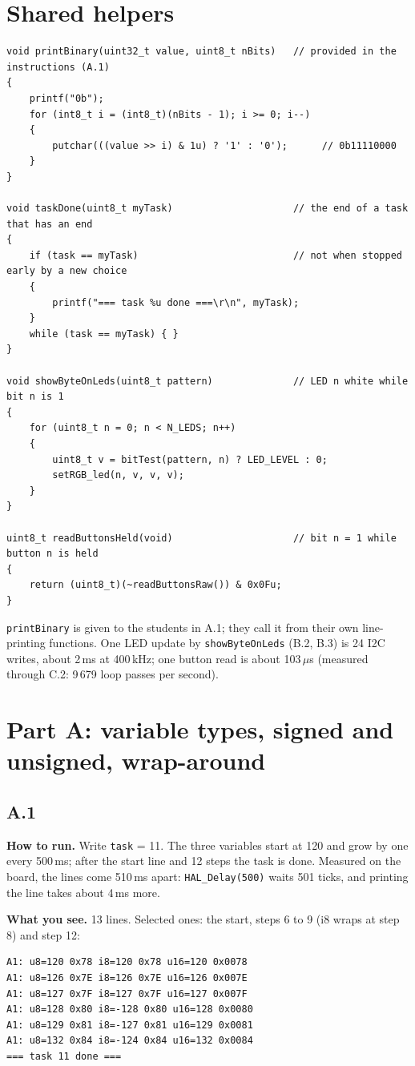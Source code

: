 \documentclass[11pt,a4paper]{article}
\newcommand{\lv}[1]{\texttt{#1}}                 %
\newcommand{\run}[1]{\textbf{How to run.} #1}
\newcommand{\see}[1]{\textbf{What you see.} #1}
\begin{document}
\section{Shared helpers}
\begin{lstlisting}
void printBinary(uint32_t value, uint8_t nBits)   // provided in the instructions (A.1)
{
    printf("0b");
    for (int8_t i = (int8_t)(nBits - 1); i >= 0; i--)
    {
        putchar(((value >> i) & 1u) ? '1' : '0');      // 0b11110000
    }
}

void taskDone(uint8_t myTask)                     // the end of a task that has an end
{
    if (task == myTask)                           // not when stopped early by a new choice
    {
        printf("=== task %u done ===\r\n", myTask);
    }
    while (task == myTask) { }
}

void showByteOnLeds(uint8_t pattern)              // LED n white while bit n is 1
{
    for (uint8_t n = 0; n < N_LEDS; n++)
    {
        uint8_t v = bitTest(pattern, n) ? LED_LEVEL : 0;
        setRGB_led(n, v, v, v);
    }
}

uint8_t readButtonsHeld(void)                     // bit n = 1 while button n is held
{
    return (uint8_t)(~readButtonsRaw()) & 0x0Fu;
}
\end{lstlisting}
\texttt{printBinary} is given to the students in A.1; they call it from their own line-printing
functions. One LED update by \texttt{showByteOnLeds} (B.2, B.3) is 24 I2C writes, about 2\,ms at 400\,kHz; one button read is about
103\,$\mu$s (measured through C.2: 9\,679 loop passes per second).

\section{Part A: variable types, signed and unsigned, wrap-around}

\subsection*{A.1}
\run{Write \lv{task} = 11. The three variables start at 120
and grow by one every 500\,ms; after the start line and 12 steps the task is done.
Measured on the board, the lines come 510\,ms apart: \texttt{HAL\_Delay(500)} waits 501 ticks, and printing the
line takes about 4\,ms more.}

\see{13 lines. Selected ones: the start, steps 6 to 9 (i8 wraps at step 8) and step 12:}
\begin{lstlisting}[language={},basicstyle=\ttfamily\scriptsize]
A1: u8=120 0x78 i8=120 0x78 u16=120 0x0078
A1: u8=126 0x7E i8=126 0x7E u16=126 0x007E
A1: u8=127 0x7F i8=127 0x7F u16=127 0x007F
A1: u8=128 0x80 i8=-128 0x80 u16=128 0x0080
A1: u8=129 0x81 i8=-127 0x81 u16=129 0x0081
A1: u8=132 0x84 i8=-124 0x84 u16=132 0x0084
=== task 11 done ===
\end{lstlisting}
\end{document}
